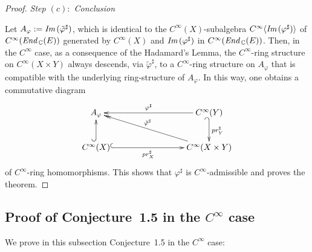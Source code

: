 \documentclass[11pt]{article}
\numberwithin{equation}{subsection}
\newcommand{\End}{\mbox{\it End}\,}
\newcommand{\Image}{\mbox{\it Im}\,}
\begin{document}
\begin{proof}
  \bigskip

  \noindent
  {\it Step $(c):$ Conclusion}

  \medskip

  \noindent
 Let $A_{\varphi}:=\Image(\tilde{\varphi}^{\sharp})$,
  which is identical to the $C^{\infty}(X)$-subalgebra
    $C^{\infty}\langle \Image(\varphi^{\sharp}) \rangle$
	 of $C^{\infty}(\End_{\Bbb C}(E))$
	 generated by $C^{\infty}(X)$ and $\Image(\varphi^{\sharp})$
	 in $C^{\infty}(\End_{\Bbb C}(E))$.
 Then, 			
   in the $C^{\infty}$ case,  as a consequence of the Hadamard's Lemma,
   the $C^{\infty}$-ring structure on $C^{\infty}(X\times Y)$ always descends,
     via $\tilde{\varphi}^{\sharp}$,
   to a $C^{\infty}$-ring structure on $A_{\varphi}$
    that is compatible with the underlying ring-structure of $A_{\varphi}$.
  In this way, one obtains a commutative diagram
     $$
		\xymatrix{
	       A_{\varphi}
			     &&& C^{\infty}(Y) \ar[lll]_-{\varphi^{\sharp}}
			                                      \ar@{_{(}->}^-{pr_Y^{\sharp}}[d]   \\			    
			   \rule{0ex}{1em}C^{\infty}(X) \ar@{^{(}->}[u]
			                                                                 \ar@{^{(}->}[rrr]_-{pr_X^{\sharp}}
				 &&& C^{\infty}(X\times Y) \ar@{->>}[lllu]_-{\tilde{\varphi}^{\sharp}}		
		}
	 $$
    of $C^{\infty}$-ring homomorphisms.
 This shows that $\varphi^{\sharp}$ is $C^{\infty}$-admissible and proves the theorem.

\end{proof}






\bigskip

\subsection{Proof of Conjecture~1.5 in the $C^{\infty}$ case}

We prove in this subsection Conjecture~1.5 in the $C^{\infty}$ case:

\bigskip
\end{document}
